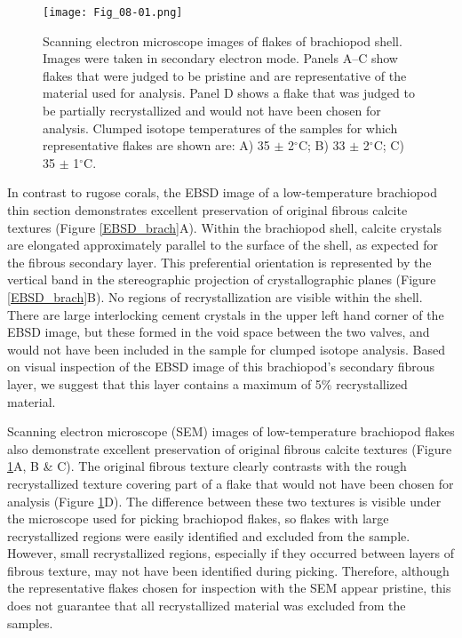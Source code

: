\documentclass[5p, authoryear]{elsarticle}
\begin{document}
\begin{figure}[tb]
\centering
\texttt{[image: Fig\_08-01.png]}
\caption{Scanning electron microscope images of flakes of brachiopod shell. Images were taken in secondary electron mode. Panels A--C show flakes that were judged to be pristine and are representative of the material used for analysis. Panel D shows a flake that was judged to be partially recrystallized and would not have been chosen for analysis. Clumped isotope temperatures of the samples for which representative flakes are shown are: A) 35 $\pm$ 2$^{\circ}$C; B) 33 $\pm$ 2$^{\circ}$C; C) 35 $\pm$ 1$^{\circ}$C.}
\label{flakes}
\end{figure}

In contrast to rugose corals, the EBSD image of a low-temperature brachiopod thin section demonstrates excellent preservation of original fibrous calcite textures (Figure \ref{EBSD_brach}A). Within the brachiopod shell, calcite crystals are elongated approximately parallel to the surface of the shell, as expected for the fibrous secondary layer. This preferential orientation is represented by the vertical band in the stereographic projection of crystallographic planes (Figure \ref{EBSD_brach}B). No regions of recrystallization are visible within the shell. There are large interlocking cement crystals in the upper left hand corner of the EBSD image, but these formed in the void space between the two valves, and would not have been included in the sample for clumped isotope analysis. Based on visual inspection of the EBSD image of this brachiopod's secondary fibrous layer, we suggest that this layer contains a maximum of 5\% recrystallized material. 

Scanning electron microscope (SEM) images of low-temperature brachiopod flakes also demonstrate excellent preservation of original fibrous calcite textures (Figure \ref{flakes}A, B \& C). The original fibrous texture clearly contrasts with the rough recrystallized texture covering part of a flake that would not have been chosen for analysis (Figure \ref{flakes}D). The difference between these two textures is visible under the microscope used for picking brachiopod flakes, so flakes with large recrystallized regions were easily identified and excluded from the sample. However, small recrystallized regions, especially if they occurred between layers of fibrous texture, may not have been identified during picking. Therefore, although the representative flakes chosen for inspection with the SEM appear pristine, this does not guarantee that all recrystallized material was excluded from the samples.
\end{document}
